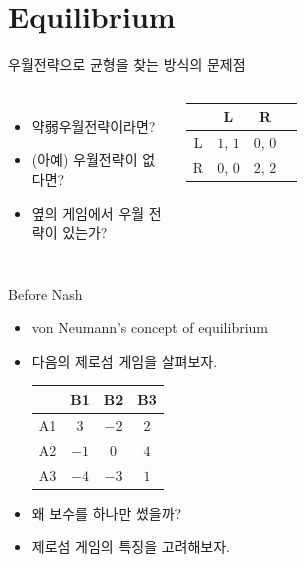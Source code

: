 \documentclass[final]{beamer}
\begin{document}
\section{Equilibrium} %
\label{sec:equilibrium}

\begin{frame}[t]{우월전략으로 균형을 찾는 방식의 문제점}
	\begin{columns}[c]
	\column{15em}
	\begin{itemize}
		\item 약弱우월전략이라면?
		\item (아예) 우월전략이 없다면?  
		\item 옆의 게임에서 우월 전략이 있는가? 
	\end{itemize}
	\column{15em}
	\begin{table}
	\setlength{\tabcolsep}{1.2em}
	\begin{tabular}{|c|c|c|c|} \hline
	& {L} &  {R}\\ \hline
	{L} & {$1$}, {$1$} & {$0$}, {$0$} \\ \hline%
	{R} & {$0$}, {$0$}  & {$2$}, {$2$}\\ 
	\hline
	\end{tabular}
	\end{table}
	\end{columns}
	\vspace{2em}
	\begin{center}
	\end{center}
\end{frame}

\begin{frame}[t]{Before Nash}
	\begin{itemize}
	\item von Neumann's concept of equilibrium
	\item 다음의 제로섬 게임을 살펴보자.\\
	\vspace{2em}
	\begin{center}
	\begin{table}
	\setlength{\tabcolsep}{1.2em}
	\begin{tabular}{|c|c|c|c|} \hline
	& {B1} &  {B2} & {B3}\\ \hline
	{A1} & {$3$} & {$-2$} & {$2$} \\ \hline%
	{A2} & {$-1$} & {$0$} & {$4$} \\ \hline
	{A3} & {$-4$}  & {$-3$} & {$1$} \\ \hline
	\end{tabular}
	\end{table}
	\end{center}
	\vspace{2em}
	\item 왜 보수를 하나만 썼을까? 
	\item 제로섬 게임의 특징을 고려해보자. 
	\end{itemize}
\end{frame}
\end{document}
